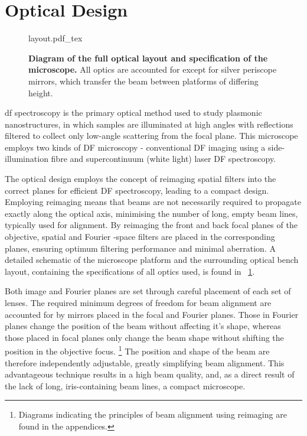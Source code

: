 \documentclass{article}
\begin{document}
\section{Optical Design}
\label{sec:optical_design}

\begin{figure}[p]
\centering
\fontsize{9.5pt}{1em}\selectfont
\def\svgwidth{0.93\textwidth}
{layout.pdf_tex}
\caption[Diagram of the full optical layout]{\textbf{Diagram of the full optical layout and specification of the microscope.} All optics are accounted for except for silver periscope mirrors, which transfer the beam between platforms of differing height.}
\label{fig:layout}
\end{figure}

\Gls{df} spectroscopy is the primary optical method used to study plasmonic nanostructures, in which samples are illuminated at high angles with reflections filtered to collect only low-angle scattering from the focal plane. This microscope employs two kinds of DF microscopy - conventional DF imaging using a side-illumination fibre and supercontinuum (white light) laser DF spectroscopy.

The optical design employs the concept of reimaging spatial filters into the correct planes for efficient DF spectroscopy, leading to a compact design. Employing reimaging means that beams are not necessarily required to propagate exactly along the optical axis, minimising the number of long, empty beam lines, typically used for alignment. By reimaging the front and back focal planes of the objective, spatial and Fourier \wvm-space filters are placed in the corresponding planes, ensuring optimum filtering performance and minimal aberration. A detailed schematic of the microscope platform and the surrounding optical bench layout, containing the specifications of all optics used, is found in \figurename~\ref{fig:layout}.

Both image and Fourier planes are set through careful placement of each set of lenses. The required minimum degrees of freedom for beam alignment are accounted for by mirrors placed in the focal and Fourier planes. Those in Fourier planes change the position of the beam without affecting it's shape, whereas those placed in focal planes only change the beam shape without shifting the position in the objective focus.%
\footnote{Diagrams indicating the principles of beam alignment using reimaging are found in the appendices.}
The position and shape of the beam are therefore independently adjustable, greatly simplifying beam alignment. This advantageous technique results in a high beam quality, and, as a direct result of the lack of long, iris-containing beam lines, a compact microscope.
\end{document}
